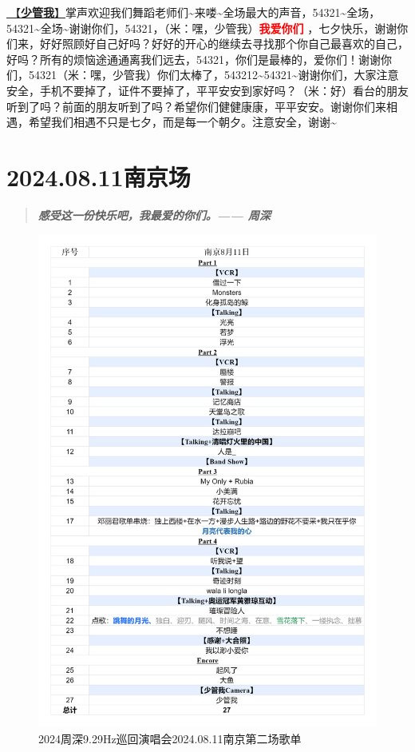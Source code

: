 \documentclass[]{ctexbook}
\begin{document}
\hyperref[watch-ur-manners]{🎵【\textbf{少管我}】}掌声欢迎我们舞蹈老师们\textasciitilde 来喽\textasciitilde 全场最大的声音，54321\textasciitilde 全场，54321\textasciitilde 全场\textasciitilde 谢谢你们，54321，（米：嘿，少管我）\textbf{\textcolor{red}{我爱你们} }，七夕快乐，谢谢你们来，好好照顾好自己好吗？好好的开心的继续去寻找那个你自己最喜欢的自己，好吗？所有的烦恼途通通离我们远去，54321，你们是最棒的，爱你们！谢谢你们，54321（米：嘿，少管我）你们太棒了，543212\textasciitilde54321\textasciitilde 谢谢你们，大家注意安全，手机不要掉了，证件不要掉了，平平安安到家好吗？（米：好）看台的朋友听到了吗？前面的朋友听到了吗？希望你们健健康康，平平安安。谢谢你们来相遇，希望我们相遇不只是七夕，而是每一个朝夕。注意安全，谢谢\textasciitilde{}

\chapter{2024.08.11南京场}\label{nanjing-20240811}

\begin{quote}
\textbf{\emph{感受这一份快乐吧，我最爱的你们。------ 周深}}
\end{quote}

\begin{figure}

{\centering \includegraphics[width=330pt]{img/playlists/playlists-nanjing-20240811} 

}

\caption{2024周深9.29Hz巡回演唱会2024.08.11南京第二场歌单}\label{fig:unnamed-chunk-63}
\end{figure}
\end{document}
